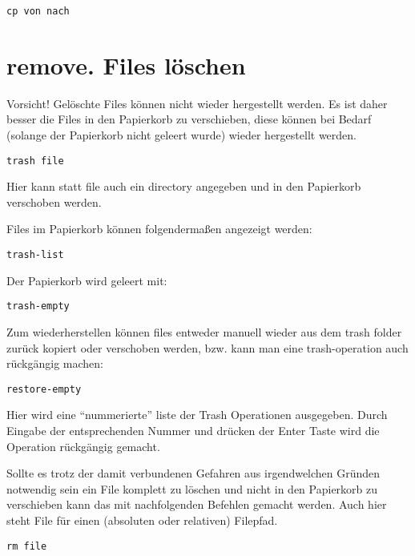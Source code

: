 \documentclass[]{book}
\begin{document}
\begin{verbatim}
cp von nach
\end{verbatim}

\hypertarget{remove.-files-loschen}{%
\section{remove. Files löschen}\label{remove.-files-loschen}}

Vorsicht! Gelöschte Files können nicht wieder hergestellt werden.
Es ist daher besser die Files in den Papierkorb zu verschieben, diese
können bei Bedarf (solange der Papierkorb nicht geleert wurde) wieder
hergestellt werden.

\begin{verbatim}
trash file
\end{verbatim}

Hier kann statt file auch ein directory angegeben und in den Papierkorb verschoben werden.

Files im Papierkorb können folgendermaßen angezeigt werden:

\begin{verbatim}
trash-list
\end{verbatim}

Der Papierkorb wird geleert mit:

\begin{verbatim}
trash-empty
\end{verbatim}

Zum wiederherstellen können files entweder manuell wieder
aus dem trash folder zurück kopiert oder verschoben werden, bzw. kann man eine trash-operation auch rückgängig machen:

\begin{verbatim}
restore-empty
\end{verbatim}

Hier wird eine ``nummerierte'' liste der Trash Operationen ausgegeben. Durch Eingabe der entsprechenden Nummer und drücken der Enter Taste wird die
Operation rückgängig gemacht.

Sollte es trotz der damit verbundenen Gefahren aus irgendwelchen Gründen notwendig sein ein File
komplett zu löschen und nicht in den Papierkorb zu verschieben kann das mit nachfolgenden Befehlen
gemacht werden. Auch hier steht File für einen (absoluten oder relativen) Filepfad.

\begin{verbatim}
rm file
\end{verbatim}
\end{document}
